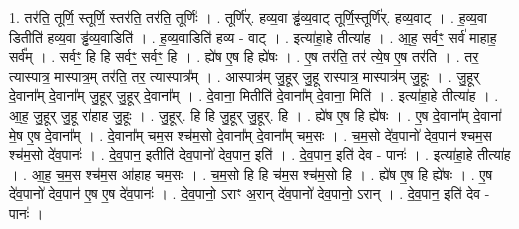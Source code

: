 \documentclass[17pt]{extarticle}
\begin{document}
1. तर॑ति॒ तूर्णि॒ स्तूर्णि॒ स्तर॑ति॒ तर॑ति॒ तूर्णिः॑ । . तूर्णि॑र्. हव्य॒वा ड्ढ॑व्य॒वाट् तूर्णि॒स्तूर्णि॑र्. हव्य॒वाट् । . ह॒व्य॒वा डितीति॑ हव्य॒वा ड्ढ॑व्य॒वाडिति॑ । . ह॒व्य॒वाडिति॑ हव्य - वाट् । . इत्या॑हा॒हे तीत्या॑ह । . आ॒ह॒ सर्वꣳ॒॒ सर्व॑ माहाह॒ सर्व᳚म् । . सर्वꣳ॒॒ हि हि सर्वꣳ॒॒ सर्वꣳ॒॒ हि । . ह्ये॑ष ए॒ष हि ह्ये॑षः । . ए॒ष तर॑ति॒ तर॑ त्ये॒ष ए॒ष तर॑ति । . तर॒ त्यास्पात्र॒ मास्पात्र॒म् तर॑ति॒ तर॒ त्यास्पात्र᳚म् । . आस्पात्र॑म् जु॒हूर् जु॒हू रास्पात्र॒ मास्पात्र॑म् जु॒हूः । . जु॒हूर् दे॒वाना᳚म् दे॒वाना᳚म् जु॒हूर् जु॒हूर् दे॒वाना᳚म् । . दे॒वाना॒ मितीति॑ दे॒वाना᳚म् दे॒वाना॒ मिति॑ । . इत्या॑हा॒हे तीत्या॑ह । . आ॒ह॒ जु॒हूर् जु॒हू रा॑हाह जु॒हूः । . जु॒हूर्. हि हि जु॒हूर् जु॒हूर्. हि । . ह्ये॑ष ए॒ष हि ह्ये॑षः । . ए॒ष दे॒वाना᳚म् दे॒वाना॑ मे॒ष ए॒ष दे॒वाना᳚म् । . दे॒वाना᳚म् चम॒स श्च॑म॒सो दे॒वाना᳚म् दे॒वाना᳚म् चम॒सः । . च॒म॒सो दे॑व॒पानो॑ देव॒पान॑ श्चम॒स श्च॑म॒सो दे॑व॒पानः॑ । . दे॒व॒पान॒ इतीति॑ देव॒पानो॑ देव॒पान॒ इति॑ । . दे॒व॒पान॒ इति॑ देव - पानः॑ । . इत्या॑हा॒हे तीत्या॑ह । . आ॒ह॒ च॒म॒स श्च॑म॒स आ॑हाह चम॒सः । . च॒म॒सो हि हि च॑म॒स श्च॑म॒सो हि । . ह्ये॑ष ए॒ष हि ह्ये॑षः । . ए॒ष दे॑व॒पानो॑ देव॒पान॑ ए॒ष ए॒ष दे॑व॒पानः॑ । . दे॒व॒पानो॒ ऽराꣳ अ॒रान् दे॑व॒पानो॑ देव॒पानो॒ ऽरान् । . दे॒व॒पान॒ इति॑ देव - पानः॑ । \newline
\end{document}
